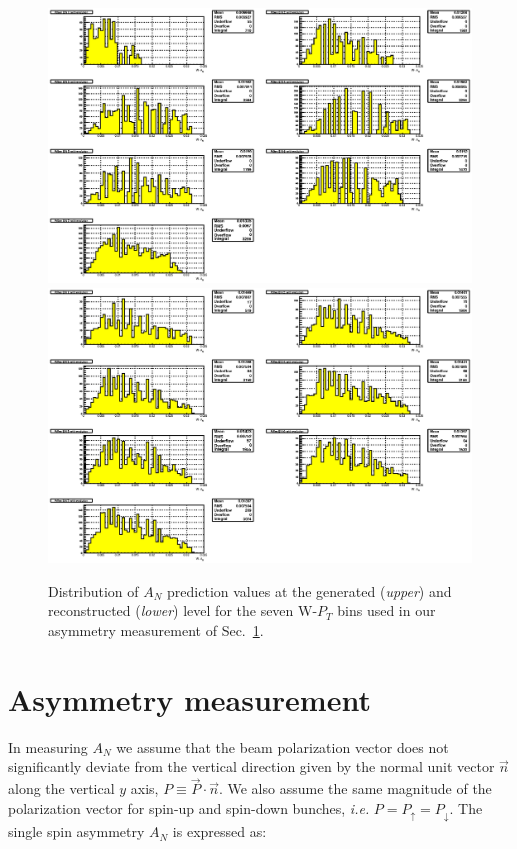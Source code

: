 \documentclass[12pt]{article}
\begin{document}
\begin{figure}[htbp]
\begin{center}
\includegraphics[scale=0.87]{images/systematics/plot_Wm_An_evol_ZK_Vs_PtGen_projs}
\includegraphics[scale=0.85]{images/systematics/plot_Wm_An_evol_ZK_Vs_PtRec_projs}
\end{center}
\caption{Distribution of $A_{N}$ prediction values at the generated ({\it upper}) and reconstructed ({\it lower}) level for the seven W-$P_{T}$ bins used in our asymmetry measurement of Sec.~\ref{Sec:W-An-measurement}.}
\label{fig:SysAnPt} 
\end{figure}


\section{Asymmetry measurement} \label{Sec:W-An-measurement}
In measuring $A_{N}$ we assume that the beam polarization vector does not significantly
deviate from the vertical direction given by the normal unit vector $\vec n$
along the vertical $y$ axis, $P \equiv \vec{P} \cdot \vec{n}$. 
We also assume the same magnitude of the polarization vector for
spin-up and spin-down bunches, \textit{i.e.} $P = P_\uparrow = P_\downarrow$.
The single spin asymmetry $A_N$ is expressed as:
\end{document}
